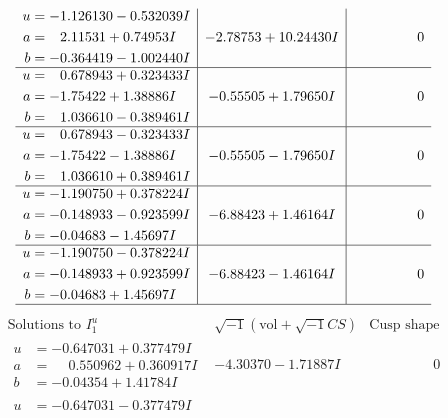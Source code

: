 \documentclass[1p]{elsarticle_modified}
\theoremstyle{definition}
\newcommand{\I}{\sqrt{-1}}
\begin{document}
$$\begin{array}{c|c|c}
\begin{aligned}
u &= -1.126130 - 0.532039 I \\
a &= \phantom{-}2.11531 + 0.74953 I \\
b &= -0.364419 - 1.002440 I\end{aligned}
 & -2.78753 + 10.24430 I & \phantom{-0.000000 } 0 \\ \hline\begin{aligned}
u &= \phantom{-}0.678943 + 0.323433 I \\
a &= -1.75422 + 1.38886 I \\
b &= \phantom{-}1.036610 - 0.389461 I\end{aligned}
 & -0.55505 + 1.79650 I & \phantom{-0.000000 } 0 \\ \hline\begin{aligned}
u &= \phantom{-}0.678943 - 0.323433 I \\
a &= -1.75422 - 1.38886 I \\
b &= \phantom{-}1.036610 + 0.389461 I\end{aligned}
 & -0.55505 - 1.79650 I & \phantom{-0.000000 } 0 \\ \hline\begin{aligned}
u &= -1.190750 + 0.378224 I \\
a &= -0.148933 - 0.923599 I \\
b &= -0.04683 - 1.45697 I\end{aligned}
 & -6.88423 + 1.46164 I & \phantom{-0.000000 } 0 \\ \hline\begin{aligned}
u &= -1.190750 - 0.378224 I \\
a &= -0.148933 + 0.923599 I \\
b &= -0.04683 + 1.45697 I\end{aligned}
 & -6.88423 - 1.46164 I & \phantom{-0.000000 } 0\\
 \hline 
 \end{array}$$\newpage$$\begin{array}{c|c|c}  
\text{Solutions to }I^u_{1}& \I (\text{vol} + \sqrt{-1}CS) & \text{Cusp shape}\\
 \hline 
\begin{aligned}
u &= -0.647031 + 0.377479 I \\
a &= \phantom{-}0.550962 + 0.360917 I \\
b &= -0.04354 + 1.41784 I\end{aligned}
 & -4.30370 - 1.71887 I & \phantom{-0.000000 } 0 \\ \hline\begin{aligned}
u &= -0.647031 - 0.377479 I \\

\end{aligned}
\end{array}$$
\end{document}
